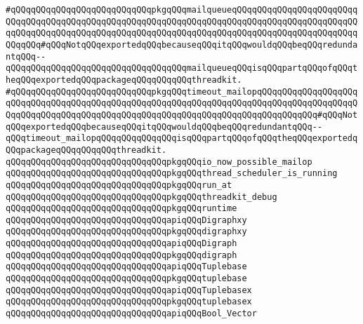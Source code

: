 \verb|#qQQqqQQqqQQqqQQqqQQqqQQqqQQqpkgqQQqmailqueueqQQqqQQqqQQqqQQqqQQqqQQqqQQqqQQqqQQqqQQqqQQqqQQqqQQqqQQqqQQqqQQqqQQqqQQqqQQqqQQqqQQqqQQqqQQqqQQqqQQqqQQqqQQqqQQqqQQqqQQqqQQqqQQqqQQqqQQqqQQqqQQqqQQqqQQqqQQqqQQqqQQqqQQqqQQq#qQQqNotqQQqexportedqQQqbecauseqQQqitqQQqwouldqQQqbeqQQqredundantqQQq--qQQqqQQqqQQqqQQqqQQqqQQqqQQqqQQqqQQqmailqueueqQQqisqQQqpartqQQqofqQQqtheqQQqexportedqQQqpackageqQQqqQQqqQQqthreadkit.|\newline
\verb|#qQQqqQQqqQQqqQQqqQQqqQQqqQQqpkgqQQqtimeout_mailopqQQqqQQqqQQqqQQqqQQqqQQqqQQqqQQqqQQqqQQqqQQqqQQqqQQqqQQqqQQqqQQqqQQqqQQqqQQqqQQqqQQqqQQqqQQqqQQqqQQqqQQqqQQqqQQqqQQqqQQqqQQqqQQqqQQqqQQqqQQqqQQqqQQqqQQq#qQQqNotqQQqexportedqQQqbecauseqQQqitqQQqwouldqQQqbeqQQqredundantqQQq--qQQqtimeout_mailopqQQqqQQqqQQqqQQqisqQQqpartqQQqofqQQqtheqQQqexportedqQQqpackageqQQqqQQqqQQqthreadkit.|\newline
\verb|qQQqqQQqqQQqqQQqqQQqqQQqqQQqqQQqpkgqQQqio_now_possible_mailop|\newline
\verb|qQQqqQQqqQQqqQQqqQQqqQQqqQQqqQQqpkgqQQqthread_scheduler_is_running|\newline
\verb|qQQqqQQqqQQqqQQqqQQqqQQqqQQqqQQqpkgqQQqrun_at|\newline
\verb|qQQqqQQqqQQqqQQqqQQqqQQqqQQqqQQqpkgqQQqthreadkit_debug|\newline
\verb|qQQqqQQqqQQqqQQqqQQqqQQqqQQqqQQqpkgqQQqruntime|\newline
\newline
\newline
\verb|qQQqqQQqqQQqqQQqqQQqqQQqqQQqqQQqapiqQQqDigraphxy|\newline
\verb|qQQqqQQqqQQqqQQqqQQqqQQqqQQqqQQqpkgqQQqdigraphxy|\newline
\newline
\verb|qQQqqQQqqQQqqQQqqQQqqQQqqQQqqQQqapiqQQqDigraph|\newline
\verb|qQQqqQQqqQQqqQQqqQQqqQQqqQQqqQQqpkgqQQqdigraph|\newline
\newline
\verb|qQQqqQQqqQQqqQQqqQQqqQQqqQQqqQQqapiqQQqTuplebase|\newline
\verb|qQQqqQQqqQQqqQQqqQQqqQQqqQQqqQQqpkgqQQqtuplebase|\newline
\newline
\verb|qQQqqQQqqQQqqQQqqQQqqQQqqQQqqQQqapiqQQqTuplebasex|\newline
\verb|qQQqqQQqqQQqqQQqqQQqqQQqqQQqqQQqpkgqQQqtuplebasex|\newline
\newline
\verb|qQQqqQQqqQQqqQQqqQQqqQQqqQQqqQQqapiqQQqBool_Vector|\newline
